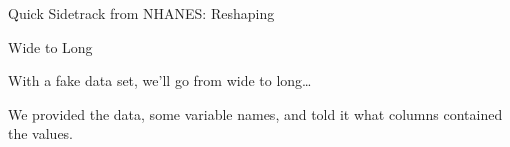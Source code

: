 \begin{frame}[fragile]{Quick Sidetrack from NHANES: Reshaping}

\begin{block}{Wide to Long}

With a fake data set, we'll go from wide to long\ldots{}

\begin{Shaded}
\begin{Highlighting}[]
\StringTok{ }\NormalTok{(}\NormalTok{=}\NormalTok{(}\OperatorTok{:}\NormalTok{), }
                      \NormalTok{=}\NormalTok{(}\NormalTok{), }
                      \NormalTok{=}\NormalTok{(}\NormalTok{))}
\StringTok{ }\NormalTok{, }\NormalTok{, }\OperatorTok{:}\NormalTok{)}
\end{Highlighting}
\end{Shaded}

We provided the data, some variable names, and told it what columns
contained the values.

\end{block}

\end{frame}

